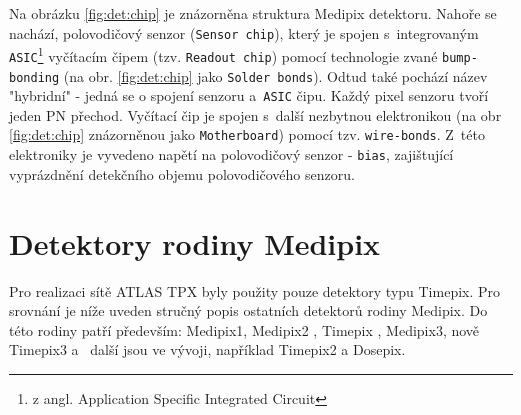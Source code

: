 Na obrázku \ref{fig:det:chip} je znázorněna struktura Medipix detektoru. Nahoře se nachází, polovodičový senzor (\texttt{Sensor chip}), který je spojen s~integrovaným \texttt{ASIC}\footnote{z angl. Application Specific Integrated Circuit} vyčítacím čipem (tzv. \texttt{Readout chip}) pomocí technologie zvané \texttt{bump-bonding} (na obr. \ref{fig:det:chip} jako \texttt{Solder bonds}). Odtud také pochází název "hybridní" - jedná se o spojení senzoru a~\texttt{ASIC} čipu. Každý pixel senzoru tvoří jeden PN přechod. Vyčítací čip je spojen s~další nezbytnou elektronikou (na obr \ref{fig:det:chip} znázorněnou jako \texttt{Motherboard}) pomocí tzv. \texttt{wire-bonds}. Z~této elektroniky je vyvedeno napětí na polovodičový senzor - \texttt{bias}, zajištující vyprázdnění detekčního objemu polovodičového senzoru.


\newpage
\section{Detektory rodiny Medipix}\label{det:med}
Pro realizaci sítě ATLAS TPX byly použity pouze detektory typu Timepix. Pro srovnání je níže uveden stručný popis ostatních detektorů rodiny Medipix.
Do této rodiny patří především: Medipix1, Medipix2 \cite{Llopart-medipix2}, Timepix \cite{timepix}, Medipix3, nově Timepix3 \cite{timepix3} a~ další jsou ve vývoji, například Timepix2 a Dosepix. 

